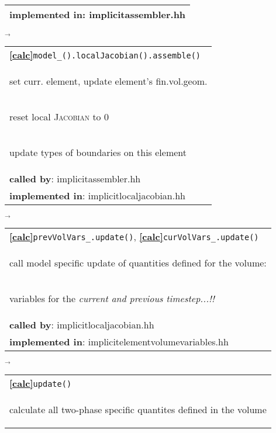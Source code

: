\begin{landscape}
{\begin{tabular}{|l|}
      \textbf{implemented in}: implicitassembler.hh\\
      \hline
     \end{tabular}
\nextline
    {\scriptsize$\overrightarrow{
        }$}
     \begin{tabular}{|l|}
      \hline
     \textbf{\textcircled{\ref{calc}}}\verb+model_().localJacobian().assemble()+ \\
     \begin{scriptsize}set curr. element, update element's fin.vol.geom.\end{scriptsize}\\
     \begin{scriptsize}reset local \textsc{Jacobian} to 0\end{scriptsize}\\
     \begin{scriptsize}update types of boundaries on this element\end{scriptsize}\\
      \textbf{called by}: implicitassembler.hh\\
      \textbf{implemented in}:  implicitlocaljacobian.hh\\
	\hline
  \end{tabular}
    $\overrightarrow{
    }$
    \begin{tabular}{|l|}
      \hline
      \textbf{\textcircled{\ref{calc}}}\verb+prevVolVars_.update()+, \textbf{\textcircled{\ref{calc}}}\verb+curVolVars_.update()+ \\
    \begin{scriptsize}call model specific update of quantities defined for the volume:\end{scriptsize}\\
    \begin{scriptsize}variables for the \emph{current and previous timestep...!!}\end{scriptsize}\\
      \textbf{called by}: implicitlocaljacobian.hh\\
      \textbf{implemented in}: implicitelementvolumevariables.hh\\
	\hline
  \end{tabular}
\nextline
    $\overrightarrow{
    }$
    \begin{tabular}{||l||}
      \hline\hline
      \textbf{\textcircled{\ref{calc}}}\verb+update()+ \\
    \begin{scriptsize}calculate all two-phase specific quantites defined in the volume\end{scriptsize}\\

\end{tabular}}
\end{landscape}
